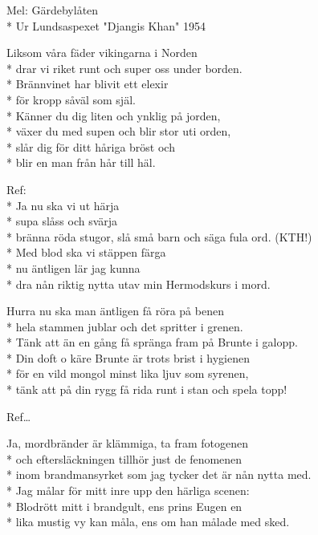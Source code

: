 \begin{SongText}[Härjarvisan]
    \begin{SongInfo}
        Mel: Gärdebylåten\\*%
        Ur Lundsaspexet "Djangis Khan" 1954
    \end{SongInfo}
    \begin{SongVerse}
        Liksom våra fäder vikingarna i Norden\\*%
        drar vi riket runt och super oss under borden.\\*%
        Brännvinet har blivit ett elexir\\*%
        för kropp såväl som själ.\\*%
        Känner du dig liten och ynklig på jorden,\\*%
        växer du med supen och blir stor uti orden,\\*%
        slår dig för ditt håriga bröst och\\*%
        blir en man från hår till häl.
    \end{SongVerse}
    \begin{SongVerse}
        Ref:\\*%
        Ja nu ska vi ut härja\\*%
        supa slåss och svärja\\*%
        bränna röda stugor, slå små barn och säga fula ord. (KTH!)\\*%
        Med blod ska vi stäppen färga\\*%
        nu äntligen lär jag kunna\\*%
        dra nån riktig nytta utav min Hermodskurs i mord.
    \end{SongVerse}
    \begin{SongVerse}
        Hurra nu ska man äntligen få röra på benen\\*%
        hela stammen jublar och det spritter i grenen.\\*%
        Tänk att än en gång få spränga fram på Brunte i galopp.\\*%
        Din doft o käre Brunte är trots brist i hygienen\\*%
        för en vild mongol minst lika ljuv som syrenen,\\*%
        tänk att på din rygg få rida runt i stan och spela topp!
    \end{SongVerse}
    \begin{SongVerse}
        Ref…
    \end{SongVerse}
    \begin{SongVerse}
        Ja, mordbränder är klämmiga, ta fram fotogenen\\*%
        och eftersläckningen tillhör just de fenomenen\\*%
        inom brandmansyrket som jag tycker det är nån nytta med.\\*%
        Jag målar för mitt inre upp den härliga scenen:\\*%
        Blodrött mitt i brandgult, ens prins Eugen en\\*%
        lika mustig vy kan måla, ens om han målade med sked.
    \end{SongVerse}
\end{SongText}
